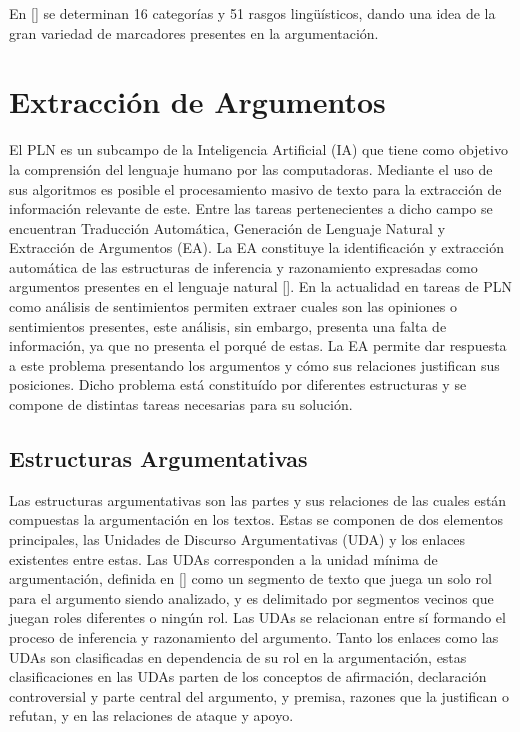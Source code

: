 En [\cite{venegas2005hacia}] se determinan 16 categorías y 51 rasgos lingüísticos, dando una idea 
de la gran variedad de marcadores presentes en la argumentación.

\section{Extracción de Argumentos}

El PLN es un subcampo de la Inteligencia Artificial (IA) que tiene como objetivo la comprensión 
del lenguaje humano por las computadoras. 
Mediante el uso de sus algoritmos es posible el procesamiento masivo de texto para la extracción de información 
relevante de este. Entre las tareas pertenecientes a dicho campo se encuentran Traducción Automática, 
Generación de Lenguaje Natural y Extracción de Argumentos (EA). La EA constituye la identificación y extracción 
automática de las estructuras de inferencia y 
razonamiento expresadas como argumentos presentes en el lenguaje natural [\cite{lawrence2020argument}].
En la actualidad en tareas de PLN como análisis de sentimientos permiten 
extraer cuales son las opiniones o sentimientos presentes, este análisis, sin embargo, presenta una falta 
de información, ya que no presenta el porqué de estas. La EA permite dar respuesta a este problema presentando
los argumentos y cómo sus relaciones justifican sus posiciones. Dicho problema está constituído por diferentes 
estructuras y se compone de distintas tareas necesarias para su solución.

\subsection{Estructuras Argumentativas}

Las estructuras argumentativas son las partes y sus relaciones de las cuales están compuestas la argumentación en los textos.
Estas se componen de dos elementos principales, las Unidades de Discurso Argumentativas (UDA) y los enlaces
existentes entre estas. Las UDAs corresponden a la unidad mínima de argumentación, definida en [\cite{stede2018argumentation}]
como un segmento de texto que juega un solo rol para el argumento siendo analizado, y es 
delimitado por segmentos vecinos que juegan roles diferentes o ningún rol.
Las UDAs se relacionan entre sí formando el proceso de inferencia y razonamiento del argumento.
Tanto los enlaces como las UDAs son clasificadas en dependencia de su rol en la argumentación, estas clasificaciones 
en las UDAs parten de los conceptos de afirmación, declaración controversial y parte central del argumento, y premisa,
razones que la justifican o refutan, y en las relaciones de ataque y apoyo. 

